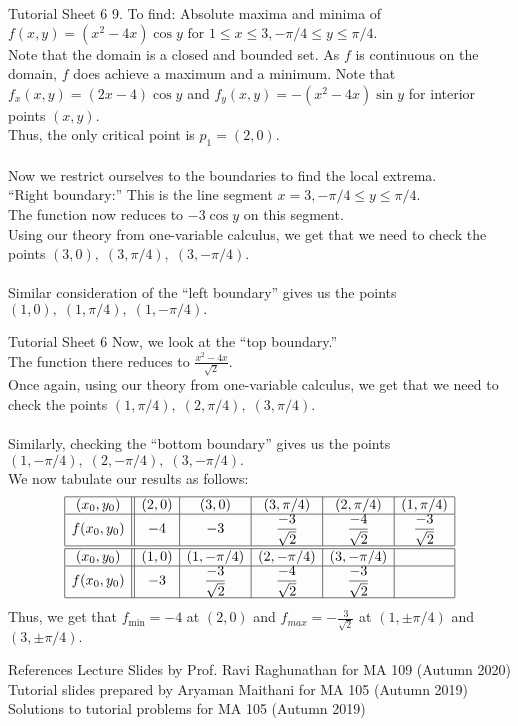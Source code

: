 \documentclass[aspectratio=169]{beamer}
\begin{document}
\begin{frame}{Tutorial Sheet 6}
	9. To find: Absolute maxima and minima of $f(x, y)=\left(x^{2}-4 x\right) \cos y \text { for } 1 \leq x \leq 3,-\pi / 4 \leq y \leq \pi / 4.$\\
	Note that the domain is a closed and bounded set. As $f$ is continuous on the domain, $f$ does achieve a maximum and a minimum.
	 Note that $f_x(x, y) = (2 x-4) \cos y$ and $f_y(x, y) = -\left(x^{2}-4 x\right) \sin y$ for interior points $(x, y).$ \\
	Thus, the only critical point is $p_1 = (2, 0).$ \\~\\
	Now we restrict ourselves to the boundaries to find the local extrema. \\
	``Right boundary:'' This is the line segment $x = 3, -\pi / 4 \leq y \leq \pi / 4.$ \\
	The function now reduces to $-3\cos y$ on this segment. \\
	Using our theory from one-variable calculus, we get that we need to check the points $(3, 0),\;(3, \pi/4),\;(3, -\pi/4).$ \\~\\
	Similar consideration of the ``left boundary'' gives us the points $(1, 0),\;(1, \pi/4),\;(1, -\pi/4).$
\end{frame}

\begin{frame}{Tutorial Sheet 6}
	Now, we look at the ``top boundary.''\\
	The function there reduces to $\frac{x^2 - 4x}{\sqrt{2}}.$ \\
	Once again, using our theory from one-variable calculus, we get that we need to check the points $(1, \pi/4),\;(2, \pi/4),\;(3, \pi/4).$ \\~\\
	Similarly, checking the ``bottom boundary'' gives us the points $(1, -\pi/4),\;(2, -\pi/4),\;(3, -\pi/4).$ \\
	We now tabulate our results as follows:
	\begin{equation*}
	    \begin{array}{|c||c|c|c|c|c|}
        	\hline
        	(x_0, y_0) & (2, 0) & (3, 0) & (3, \pi/4) & (2, \pi/4) & (1, \pi/4) \\
        	\hline
        	f(x_0, y_0) & -4 & -3 & \dfrac{-3}{\sqrt{2}} & \dfrac{-4}{\sqrt{2}} & \dfrac{-3}{\sqrt{2}} \\
        	\hline
        	\hline
        	(x_0, y_0) & (1, 0) & (1, -\pi/4) & (2, -\pi/4) & (3, -\pi/4) &  \\
        	\hline
        	f(x_0, y_0) & -3 & \dfrac{-3}{\sqrt{2}} & \dfrac{-4}{\sqrt{2}} & \dfrac{-3}{\sqrt{2}} & \\
        	\hline 
    	\end{array}
	\end{equation*}
	Thus, we get that $f_{\text{min}} = -4$ at $(2, 0)$ and $f_{max} = -\frac{3}{\sqrt{2}}$ at $(1, \pm \pi/4)$ and $(3, \pm\pi/4).$
\end{frame}

\begin{frame}{References}
    Lecture Slides by Prof. Ravi Raghunathan for MA 109 (Autumn 2020) \\
    Tutorial slides prepared by Aryaman Maithani for MA 105 (Autumn 2019) \\
    Solutions to tutorial problems for MA 105 (Autumn 2019) \\
\end{frame}
\end{document}

